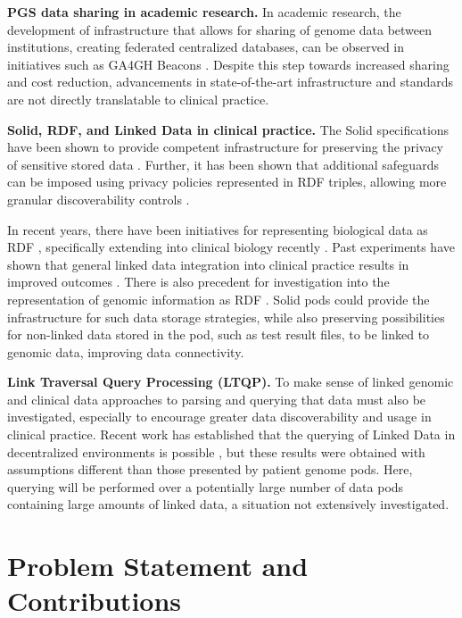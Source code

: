 \documentclass[runningheads]{llncs}
\begin{document}
\textbf{PGS data sharing in academic research.}
In academic research, the development of infrastructure that allows for sharing of genome data between institutions, creating federated centralized databases, can be observed in initiatives such as GA4GH Beacons \cite{rambla_beacon_2022}.
Despite this step towards increased sharing and cost reduction, advancements in state-of-the-art infrastructure and standards are not directly translatable to clinical practice. 

\textbf{Solid, RDF, and Linked Data in clinical practice.}
The Solid specifications have been shown to provide competent infrastructure for preserving the privacy of sensitive stored data \cite{esposito_assessing_2022}.
Further, it has been shown that additional safeguards can be imposed using privacy policies represented in RDF triples, allowing more granular discoverability controls \cite{benaribi_sparql-based_2023}. 

In recent years, there have been initiatives for representing biological data as RDF \cite{sib_swiss_institute_of_bioinformatics_rdf_group_members_sib_2024}, specifically extending into clinical biology recently \cite{van_der_horst_bridging_2023}. 
Past experiments have shown that general linked data integration into clinical practice results in improved outcomes \cite{farinelli_linked_2015}.
There is also precedent for investigation into the representation of genomic information as RDF \cite{prasanna_scalable_2023}\cite{van_der_horst_bridging_2023}.
Solid pods could provide the infrastructure for such data storage strategies, while also preserving possibilities for non-linked data stored in the pod, such as test result files, to be linked to genomic data, improving data connectivity. 

\textbf{Link Traversal Query Processing (LTQP).}
To make sense of linked genomic and clinical data approaches to parsing and querying that data must also be investigated, especially to encourage greater data discoverability and usage in clinical practice.
Recent work has established that the querying of Linked Data in decentralized environments is possible \cite{taelman_evaluation_2023}, but these results were obtained with assumptions different than those presented by patient genome pods.
Here, querying will be performed over a potentially large number of data pods containing large amounts of linked data, a situation not extensively investigated. 

\section{Problem Statement and Contributions}
\begin{comment}
Formulate the problem you intend to solve, and how you intend to contribute to Semantic Web research. This section should include a clear formulation of one (or very few) research hypothesis (what statement you want to validate through your methodology, approach and evaluation), and/or the research questions that need to be answered.
\end{comment}
\end{document}
